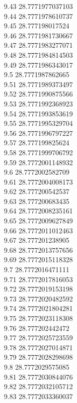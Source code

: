 {9.43	28.7771977037103\\
9.44	28.7771978610737\\
9.45	28.777198017524\\
9.46	28.7771981730667\\
9.47	28.7771983277071\\
9.48	28.7771984814503\\
9.49	28.7771986343017\\
9.5	28.7771987862665\\
9.51	28.7771989373497\\
9.52	28.7771990875566\\
9.53	28.7771992368923\\
9.54	28.7771993853619\\
9.55	28.7771995329704\\
9.56	28.7771996797227\\
9.57	28.777199825624\\
9.58	28.7771999706792\\
9.59	28.7772001148932\\
9.6	28.7772002582709\\
9.61	28.7772004008173\\
9.62	28.777200542537\\
9.63	28.777200683435\\
9.64	28.7772008235161\\
9.65	28.7772009627849\\
9.66	28.7772011012463\\
9.67	28.777201238905\\
9.68	28.7772013757656\\
9.69	28.7772015118328\\
9.7	28.7772016471111\\
9.71	28.7772017816053\\
9.72	28.7772019153198\\
9.73	28.7772020482592\\
9.74	28.7772021804281\\
9.75	28.7772023118308\\
9.76	28.777202442472\\
9.77	28.7772025723559\\
9.78	28.7772027014871\\
9.79	28.7772028298698\\
9.8	28.7772029575085\\
9.81	28.7772030844076\\
9.82	28.7772032105712\\
9.83	28.7772033360037\\
}
